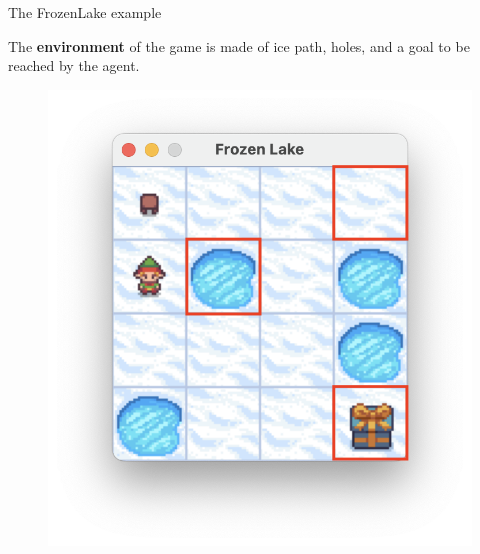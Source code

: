 \documentclass[aspectratio=169,xcolor=dvipsnames]{beamer}
\begin{document}
\begin{frame}{The FrozenLake example}

The \textbf{environment} of the game is made of ice path, holes, and a goal to be reached by the agent.
    
    \centering
    \begin{figure}{\textwidth}
        \includegraphics[scale=0.5]{images/env-elements.png}
    \end{figure}

\end{frame}

\end{document}
